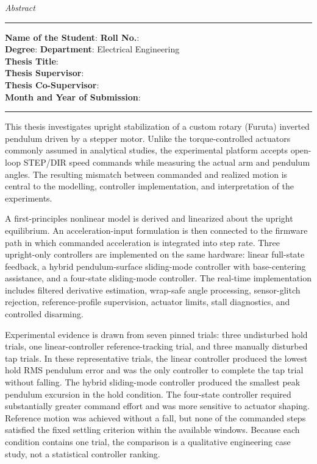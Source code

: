 \thispagestyle{plain}
\begin{center}
  {\huge\itshape Abstract\par}
\end{center}
\vspace{0.5em}

\noindent\rule{\linewidth}{0.5mm}
\textbf{Name of the Student}: \ThesisAuthor
\hfill \textbf{Roll No.}: \ThesisRollNumber\\
\textbf{Degree}: \ThesisDegreeShort
\hfill \textbf{Department}: Electrical Engineering\\
\textbf{Thesis Title}: \ThesisTitle\\
\textbf{Thesis Supervisor}: \ThesisSupervisor\\
\textbf{Thesis Co-Supervisor}: \ThesisCoSupervisor\\
\textbf{Month and Year of Submission}: \ThesisSubmissionDate
\par\noindent\rule{\linewidth}{0.5mm}

This thesis investigates upright stabilization of a custom rotary (Furuta)
inverted pendulum driven by a stepper motor. Unlike the torque-controlled
actuators commonly assumed in analytical studies, the experimental platform
accepts open-loop STEP/DIR speed commands while measuring the actual arm and
pendulum angles. The resulting mismatch between commanded and realized motion
is central to the modelling, controller implementation, and interpretation of
the experiments.

A first-principles nonlinear model is derived and linearized about the upright
equilibrium. An acceleration-input formulation is then connected to the
firmware path in which commanded acceleration is integrated into step rate.
Three upright-only controllers are implemented on the same hardware: linear
full-state feedback, a hybrid pendulum-surface sliding-mode controller with
base-centering assistance, and a four-state sliding-mode controller. The
real-time implementation includes filtered derivative estimation, wrap-safe
angle processing, sensor-glitch rejection, reference-profile supervision,
actuator limits, stall diagnostics, and controlled disarming.

Experimental evidence is drawn from seven pinned trials: three undisturbed
hold trials, one linear-controller reference-tracking trial, and three
manually disturbed tap trials. In these representative trials, the linear
controller produced the lowest hold RMS pendulum error and was the only
controller to complete the tap trial without falling. The hybrid
sliding-mode controller produced the smallest peak pendulum excursion in the
hold condition. The four-state controller required substantially greater
command effort and was more sensitive to actuator shaping. Reference motion
was achieved without a fall, but none of the commanded steps satisfied the
fixed settling criterion within the available windows. Because each condition
contains one trial, the comparison is a qualitative engineering case study,
not a statistical controller ranking.
